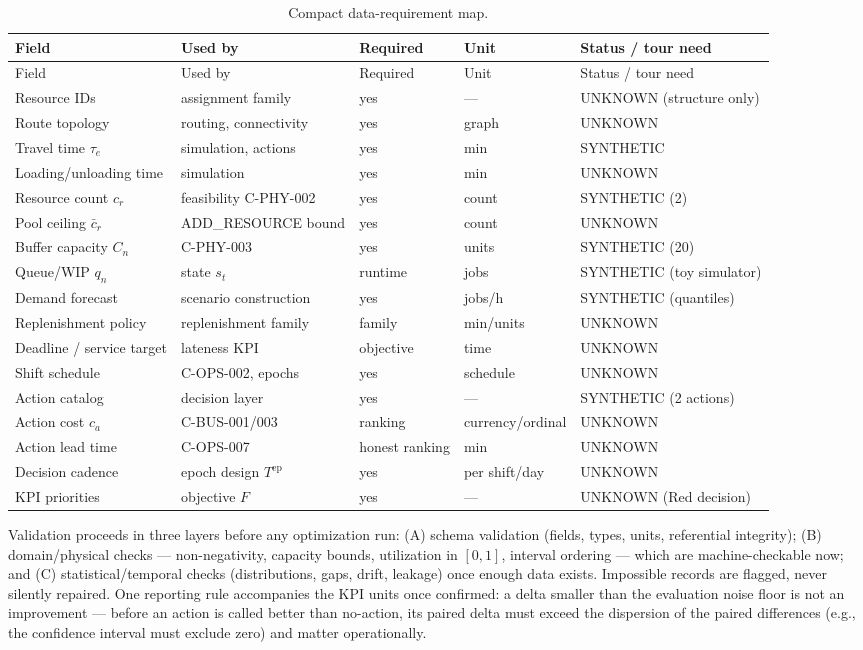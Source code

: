 \documentclass[11pt,a4paper]{article}
\newcommand{\Tset}{T^{\mathrm{ep}}}
\begin{document}
\begin{center}
\small
\begin{longtable}{@{}p{3.4cm}p{3.4cm}p{1.4cm}p{2.4cm}p{3.2cm}@{}}
\caption{Compact data-requirement map.}\\
\toprule
Field & Used by & Required & Unit & Status / tour need \\
\midrule
\endfirsthead
\toprule
Field & Used by & Required & Unit & Status / tour need \\
\midrule
\endhead
Resource IDs & assignment family & yes & --- & UNKNOWN (structure only) \\
Route topology & routing, connectivity & yes & graph & UNKNOWN \\
Travel time $\tau_e$ & simulation, actions & yes & min & SYNTHETIC \\
Loading/unloading time & simulation & yes & min & UNKNOWN \\
Resource count $c_r$ & feasibility C-PHY-002 & yes & count & SYNTHETIC (2) \\
Pool ceiling $\bar{c}_r$ & ADD\_RESOURCE bound & yes & count & UNKNOWN \\
Buffer capacity $C_n$ & C-PHY-003 & yes & units & SYNTHETIC (20) \\
Queue/WIP $q_n$ & state $s_t$ & runtime & jobs & SYNTHETIC (toy simulator) \\
Demand forecast & scenario construction & yes & jobs/h & SYNTHETIC
(quantiles) \\
Replenishment policy & replenishment family & family & min/units & UNKNOWN \\
Deadline / service target & lateness KPI & objective & time & UNKNOWN \\
Shift schedule & C-OPS-002, epochs & yes & schedule & UNKNOWN \\
Action catalog & decision layer & yes & --- & SYNTHETIC (2 actions) \\
Action cost $c_a$ & C-BUS-001/003 & ranking & currency/ordinal & UNKNOWN \\
Action lead time & C-OPS-007 & honest ranking & min & UNKNOWN \\
Decision cadence & epoch design $\Tset$ & yes & per shift/day & UNKNOWN \\
KPI priorities & objective $F$ & yes & --- & UNKNOWN (Red decision) \\
\bottomrule
\end{longtable}
\end{center}

Validation proceeds in three layers before any optimization run: (A) schema
validation (fields, types, units, referential integrity); (B)
domain/physical checks --- non-negativity, capacity bounds, utilization in
$[0,1]$, interval ordering --- which are machine-checkable now; and (C)
statistical/temporal checks (distributions, gaps, drift, leakage) once
enough data exists. Impossible records are flagged, never silently repaired.
One reporting rule accompanies the KPI units once confirmed: a delta
smaller than the evaluation noise floor is not an improvement --- before an
action is called better than no-action, its paired delta must exceed the
dispersion of the paired differences (e.g., the confidence interval must
exclude zero) and matter operationally.
\end{document}
